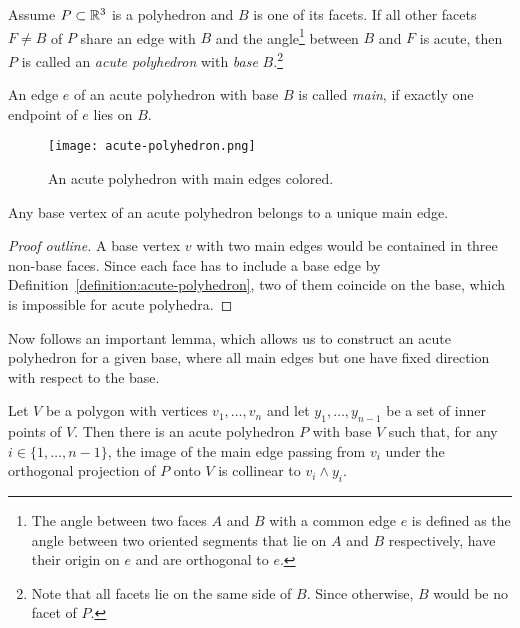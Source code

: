 \begin{definition}\label{definition:acute-polyhedron}
  Assume $P \subset \mathbb{R}^3$ is a polyhedron and $B$ is one of its facets. If all other facets $F \neq B$ of $P$
  share an edge with $B$ and
  the angle\footnote{The angle between two faces $A$ and $B$ with a common edge $e$ is defined as the angle between two oriented segments that lie on $A$ and $B$ respectively, have their origin on $e$ and are orthogonal to $e$.} between $B$ and $F$ is acute,
  then $P$ is called an \emph{acute polyhedron} with \emph{base} $B$.\footnote{Note that all facets lie on the same side of $B$. Since otherwise, $B$ would be no facet of $P$.}
\end{definition}

\begin{definition}
  An edge $e$ of an acute polyhedron with base $B$ is called \emph{main}, if exactly one endpoint of $e$ lies on $B$.
\end{definition}

\begin{figure}[ht]
  \centering
  \texttt{[image: acute-polyhedron.png]}
  \caption{An acute polyhedron with main edges colored.}
  \label{fig:acute-polyhedron}
\end{figure}

\begin{lemma}
  Any base vertex of an acute polyhedron belongs to a unique main edge.
\end{lemma}

\begin{proof}[Proof outline]
  A base vertex $v$ with two main edges would be contained in three non-base faces. Since each face has to include a base edge by Definition~\ref{definition:acute-polyhedron}, two of them coincide on the base, which is impossible for acute polyhedra.
\end{proof}

Now follows an important lemma, which allows us to construct an acute polyhedron for a given base, where all main edges but one have fixed direction with respect to the base.

\begin{lemma}\label{lemma:acute-direction}
  Let $V$ be a polygon with vertices $v_1,\dots,v_n$ and let $y_1,\dots,y_{n-1}$ be a set of inner points of $V$.
  Then there is an acute polyhedron $P$ with base $V$ such that, for any $i \in \{1,\dots,n-1\}$, the image of the main edge passing from $v_i$ under the orthogonal projection of $P$ onto $V$ is collinear to $v_i \wedge y_i$.
\end{lemma}

